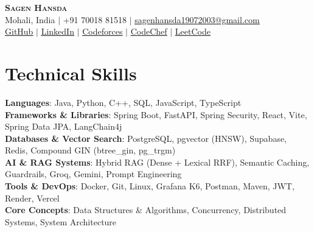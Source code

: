 \documentclass[letterpaper,11pt]{article}
\begin{document}
\begin{center}
    \textbf{\Huge \scshape Sagen Hansda} \\ \vspace{3pt}
    Mohali, India $|$ +91 70018 81518 $|$ \href{mailto:sagenhansda19072003@gmail.com}{\underline{sagenhansda19072003@gmail.com}} \\ \vspace{3pt}
    \href{https://github.com/SagenHansda19}{\underline{GitHub}} $|$
    \href{https://www.linkedin.com/in/sagen-hansda/}{\underline{LinkedIn}} $|$
    \href{https://codeforces.com/profile/Comeback_When}{\underline{Codeforces}} $|$
    \href{https://www.codechef.com/users/sagen}{\underline{CodeChef}} $|$
    \href{https://leetcode.com/u/Sagen_Hansda/}{\underline{LeetCode}}
\end{center}

\section{Technical Skills}
 \begin{itemize}[leftmargin=0.15in, label={}]
    \small{\item{
     \textbf{Languages}{: Java, Python, C++, SQL, JavaScript, TypeScript} \\ \vspace{1pt}
     \textbf{Frameworks \& Libraries}{: Spring Boot, FastAPI, Spring Security, React, Vite, Spring Data JPA, LangChain4j} \\ \vspace{1pt}
     \textbf{Databases \& Vector Search}{: PostgreSQL, pgvector (HNSW), Supabase, Redis, Compound GIN (btree\_gin, pg\_trgm)} \\ \vspace{1pt}
     \textbf{AI \& RAG Systems}{: Hybrid RAG (Dense + Lexical RRF), Semantic Caching, Guardrails, Groq, Gemini, Prompt Engineering} \\ \vspace{1pt}
     \textbf{Tools \& DevOps}{: Docker, Git, Linux, Grafana K6, Postman, Maven, JWT, Render, Vercel} \\ \vspace{1pt}
     \textbf{Core Concepts}{: Data Structures \& Algorithms, Concurrency, Distributed Systems, System Architecture}
    }}
 \end{itemize}
 \vspace{-4pt}

\end{document}
